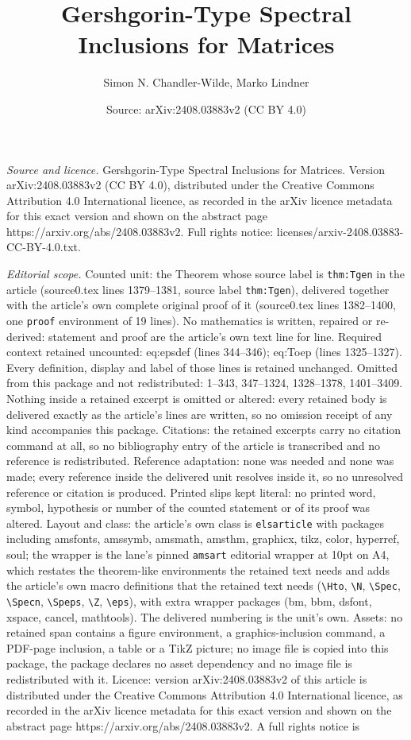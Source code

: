 \documentclass[10pt,a4paper]{amsart}
\title[Gershgorin-Type Spectral Inclusions for Matrices]{Gershgorin-Type Spectral Inclusions for Matrices}
\author{Simon N. Chandler-Wilde, Marko Lindner}
\date{Source: arXiv:2408.03883v2 (CC BY 4.0)}
\begin{document}
\maketitle

\noindent\emph{Source and licence.} Gershgorin-Type Spectral Inclusions for Matrices. Version arXiv:2408.03883v2 (CC BY 4.0), distributed under the Creative Commons Attribution 4.0 International licence, as recorded in the arXiv licence metadata for this exact version and shown on the abstract page https://arxiv.org/abs/2408.03883v2. Full rights notice: licenses/arxiv-2408.03883-CC-BY-4.0.txt.\par\smallskip

\noindent\textit{Editorial scope.} Counted unit: the Theorem whose source label is \texttt{thm:Tgen} in the article (source0.tex lines 1379--1381, source label \texttt{thm:Tgen}), delivered together with the article's own complete original proof of it (source0.tex lines 1382--1400, one \texttt{proof} environment of 19 lines). No mathematics is written, repaired or re-derived: statement and proof are the article's own text line for line. Required context retained uncounted: eq:epsdef (lines 344--346); eq:Toep (lines 1325--1327). Every definition, display and label of those lines is retained unchanged. Omitted from this package and not redistributed: 1--343, 347--1324, 1328--1378, 1401--3409. Nothing inside a retained excerpt is omitted or altered: every retained body is delivered exactly as the article's lines are written, so no omission receipt of any kind accompanies this package. Citations: the retained excerpts carry no citation command at all, so no bibliography entry of the article is transcribed and no reference is redistributed. Reference adaptation: none was needed and none was made; every reference inside the delivered unit resolves inside it, so no unresolved reference or citation is produced. Printed slips kept literal: no printed word, symbol, hypothesis or number of the counted statement or of its proof was altered. Layout and class: the article's own class is \texttt{elsarticle} with packages including amsfonts, amssymb, amsmath, amsthm, graphicx, tikz, color, hyperref, soul; the wrapper is the lane's pinned \texttt{amsart} editorial wrapper at 10pt on A4, which restates the theorem-like environments the retained text needs and adds the article's own macro definitions that the retained text needs (\texttt{\textbackslash Hto}, \texttt{\textbackslash N}, \texttt{\textbackslash Spec}, \texttt{\textbackslash Specn}, \texttt{\textbackslash Speps}, \texttt{\textbackslash Z}, \texttt{\textbackslash eps}), with extra wrapper packages (bm, bbm, dsfont, xspace, cancel, mathtools). The delivered numbering is the unit's own. Assets: no retained span contains a figure environment, a graphics-inclusion command, a PDF-page inclusion, a table or a TikZ picture; no image file is copied into this package, the package declares no asset dependency and no image file is redistributed with it. Licence: version arXiv:2408.03883v2 of this article is distributed under the Creative Commons Attribution 4.0 International licence, as recorded in the arXiv licence metadata for this exact version and shown on the abstract page https://arxiv.org/abs/2408.03883v2. A full rights notice is 
\end{document}
